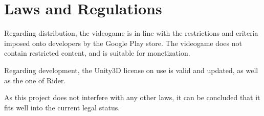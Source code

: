 \chapter{Laws and Regulations}

Regarding distribution, the videogame is in line with the restrictions and criteria imposed onto developers by the Google Play store. The videogame does not contain restricted content, and is suitable for monetization.

Regarding development, the Unity3D license on use is valid and updated, as well as the one of Rider.

As this project does not interfere with any other laws, it can be concluded that it fits well into the current legal status.
